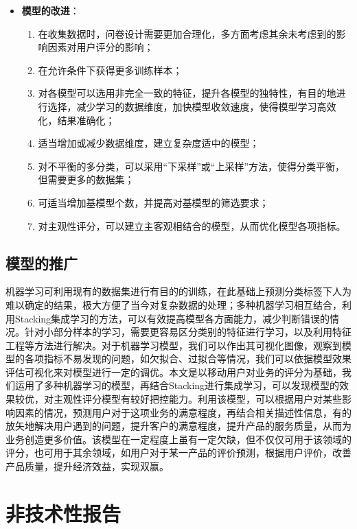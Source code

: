 \documentclass{MathorCupmodeling}
\begin{document}
\begin{itemize}
\begin{enumerate}
			\end{enumerate}
		\item \textbf{模型的改进}：
			\begin{enumerate}
				\item 在收集数据时，问卷设计需要更加合理化，多方面考虑其余未考虑到的影响因素对用户评分的影响；
				\item 在允许条件下获得更多训练样本；
				\item 对各模型可以选用非完全一致的特征，提升各模型的独特性，有目的地进行选择，减少学习的数据维度，加快模型收敛速度，使得模型学习高效化，结果准确化；
				\item 适当增加或减少数据维度，建立复杂度适中的模型；
				\item 对不平衡的多分类，可以采用“下采样”或“上采样”方法，使得分类平衡，但需要更多的数据集；
				\item 可适当增加基模型个数，并提高对基模型的筛选要求；
				\item 对主观性评分，可以建立主客观相结合的模型，从而优化模型各项指标。
			\end{enumerate}
	\end{itemize}
	\subsection{模型的推广}
	机器学习可利用现有的数据集进行有目的的训练，在此基础上预测分类标签下人为难以确定的结果，极大方便了当今对复杂数据的处理；多种机器学习相互结合，利用Stacking集成学习的方法，可以有效提高模型各方面能力，减少判断错误的情况。针对小部分样本的学习，需要更容易区分类别的特征进行学习，以及利用特征工程等方法进行解决。对于机器学习模型，我们可以作出其可视化图像，观察到模型的各项指标不易发现的问题，如欠拟合、过拟合等情况，我们可以依据模型效果评估可视化来对模型进行一定的调优。本文是以移动用户对业务的评分为基础，我们运用了多种机器学习的模型，再结合Stacking进行集成学习，可以发现模型的效果较优，对主观性评分模型有较好把控能力。利用该模型，可以根据用户对某些影响因素的情况，预测用户对于这项业务的满意程度，再结合相关描述性信息，有的放矢地解决用户遇到的问题，提升客户的满意程度，提升产品的服务质量，从而为业务创造更多价值。该模型在一定程度上虽有一定欠缺，但不仅仅可用于该领域的评分，也可用于其余领域，如用户对于某一产品的评价预测，根据用户评价，改善产品质量，提升经济效益，实现双赢。
	\newpage
	\section{非技术性报告}
	
\end{document}
